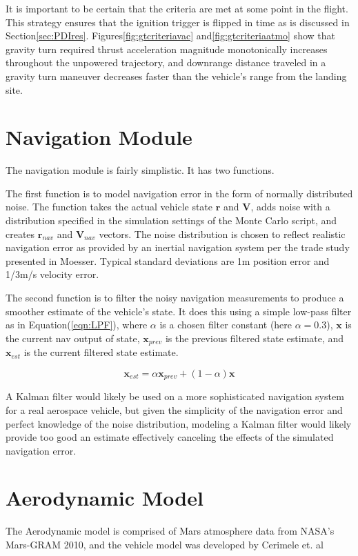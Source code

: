 It is important to be certain that the criteria are met at some point in the flight. This strategy ensures that the ignition trigger is flipped in time as is discussed in Section\:\ref{sec:PDIres}. Figures\:\ref{fig:gtcriteriavac} and\:\ref{fig:gtcriteriaatmo} show that gravity turn required thrust acceleration magnitude monotonically increases throughout the unpowered trajectory, and downrange distance traveled in a gravity turn maneuver decreases faster than the vehicle's range from the landing site.

\section{Navigation Module} \label{sec:navmod}
The navigation module is fairly simplistic. It has two functions. 

The first function is to model navigation error in the form of normally distributed noise. The function takes the actual vehicle state $\bm{r}$ and $\bm{V}$, adds noise with a distribution specified in the simulation settings of the Monte Carlo script, and creates $\bm{r}_{nav}$ and $\bm{V}_{nav}$ vectors. The noise distribution is chosen to reflect realistic navigation error as provided by an inertial navigation system per the trade study presented in Moesser\:\cite{MOESSER}. Typical standard deviations are 1\:m position error and 1/3\:m/s velocity error.

The second function is to filter the noisy navigation measurements to produce a smoother estimate of the vehicle's state. It does this using a simple low-pass filter as in Equation\:(\ref{eqn:LPF}), where $\alpha$ is a chosen filter constant (here $\alpha = 0.3$), $\bm{x}$ is the current nav output of state, $\bm{x}_{prev}$ is the previous filtered state estimate, and $\bm{x}_{est}$ is the current filtered state estimate. 

\begin{equation}
\label{eqn:LPF}
\bm{x}_{est} = \alpha \bm{x}_{prev} + (1-\alpha) \bm{x}
\end{equation}

A Kalman filter would likely be used on a more sophisticated navigation system for a real aerospace vehicle, but given the simplicity of the navigation error and perfect knowledge of the noise distribution, modeling a Kalman filter would likely provide too good an estimate effectively canceling the effects of the simulated navigation error.

\section{Aerodynamic Model}
The Aerodynamic model is comprised of Mars atmosphere data from NASA's Mars-GRAM 2010\:\cite{MARSGRAM}, and the vehicle model was developed by Cerimele et. al\:\cite{CERIMELE}

